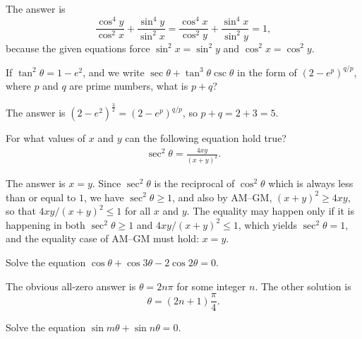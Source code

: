 \documentclass[12pt,a4paper]{memoir}
\theoremstyle{definition}
\begin{document}
\begin{solution}
	The answer is $$ \frac{\cos^4 y}{\cos^2 x} + \frac{\sin^4 y}{\sin^2 x} = \frac{\cos^4 x}{\cos^2 y} + \frac{\sin^4 x}{\sin^2 y}=1,$$ 
	because the given equations force $\sin^2 x = \sin^2 y$ and $\cos^2 x = \cos^2 y$.
\end{solution}

\begin{question}
	If $\tan^2 \theta = 1 -e^2$, and we write $\sec \theta + \tan^3 \theta \csc \theta$ in the form of $(2-e^p)^{q/p}$, where $p$ and $q$ are prime numbers, what is $p+q$?
\end{question}

\begin{solution}
	The answer is $\displaystyle \left(2-e^2\right)^{\frac{3}{2}} = (2-e^p)^{q/p}$, so $p+q=2+3=5$.
\end{solution}


\begin{question}
	For what values of $x$ and $y$ can the following equation hold true?
	\begin{align*}
		\sec^2 \theta = \frac{4xy}{(x+y)^2}.
	\end{align*}
\end{question}

\begin{solution}
	The answer is $x=y$. Since $\sec^2 \theta$ is the reciprocal of $\cos^2 \theta$ which is always less than or equal to $1$, we have $\sec^2\theta \geq 1$, and also by AM--GM, $(x+y)^2 \geq 4xy$, so that $4xy/(x+y)^2 \leq 1$ for all $x$ and $y$. The equality may happen only if it is happening in both  $\sec^2\theta \geq 1$ and $4xy/(x+y)^2 \leq 1$, which yields $\sec^2\theta=1$, and the equality case of AM--GM must hold: $x=y$.
\end{solution}



\begin{question}
	Solve the equation $\cos \theta + \cos 3\theta - 2 \cos 2\theta = 0$.
\end{question}

\begin{solution}
	The obvious all-zero answer is $\theta=2n\pi$ for some integer $n$. The other solution is $$\theta = (2n+1)\frac{\pi}{4}.$$
\end{solution}



\begin{question}
	Solve the equation $\sin m\theta + \sin n\theta = 0$.
\end{question}
\end{document}
